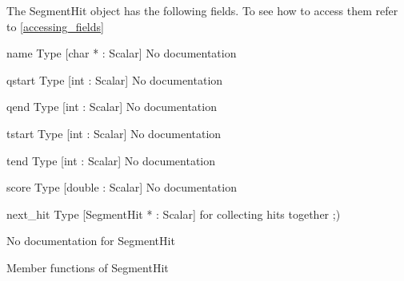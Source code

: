 The SegmentHit object has the following fields. To see how to access them refer to \ref{accessing_fields}
\begin{description}
\item{name} Type [char * : Scalar] No documentation

\item{qstart} Type [int : Scalar] No documentation

\item{qend} Type [int : Scalar] No documentation

\item{tstart} Type [int : Scalar] No documentation

\item{tend} Type [int : Scalar] No documentation

\item{score} Type [double : Scalar] No documentation

\item{next_hit} Type [SegmentHit * : Scalar]  for collecting hits together ;)

\end{description}
No documentation for SegmentHit

Member functions of SegmentHit


